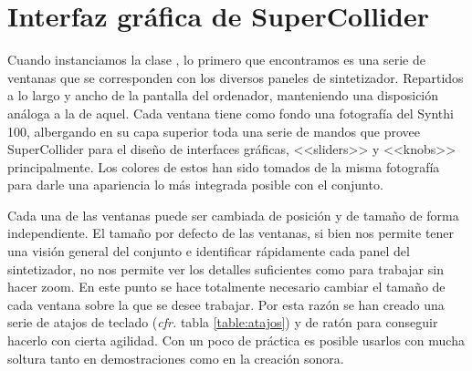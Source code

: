 \section{Interfaz gráfica de SuperCollider}
Cuando instanciamos la clase \texttt{\className}, lo primero que encontramos es una serie de ventanas que se corresponden con los diversos paneles de sintetizador. Repartidos a lo largo y ancho de la pantalla del ordenador, manteniendo una disposición análoga a la de aquel. Cada ventana tiene como fondo una fotografía del Synthi 100, albergando en su capa superior toda una serie de mandos que provee SuperCollider para el diseño de interfaces gráficas, <<sliders>> y <<knobs>> principalmente. Los colores de estos han sido tomados de la misma fotografía para darle una apariencia lo más integrada posible con el conjunto. 
	
Cada una de las ventanas puede ser cambiada de posición y de tamaño de forma independiente. El tamaño por defecto de las ventanas, si bien nos permite tener una visión general del conjunto e identificar rápidamente cada panel del sintetizador, no nos permite ver los detalles suficientes como para trabajar sin hacer zoom. En este punto se hace totalmente necesario cambiar el tamaño de cada ventana sobre la que se desee trabajar. Por esta razón se han creado una serie de atajos de teclado (\textit{cfr.} tabla \ref{table:atajos})  y de ratón para conseguir hacerlo con cierta agilidad. Con un poco de práctica es posible usarlos con mucha soltura tanto en demostraciones como en la creación sonora.
	

